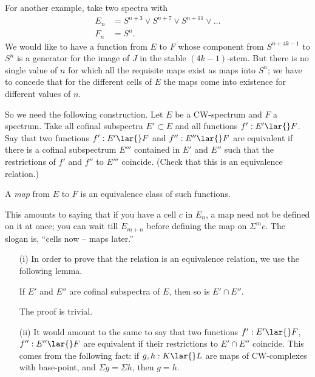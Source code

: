 \documentclass[../main]{subfiles}
\begin{document}
For another example, take two spectra with
    \begin{align*}
    E_n
    &=
    S^{n+3} \vee S^{n+7} \vee S^{n+11} \vee \hdots \\
    F_n &= S^n.
    \end{align*}
We would like to have a function from $E$ to $F$ whose component from $S^{n+4k-1}$ to $S^n$ is a generator for the image of $J$ in the stable $(4k-1)$-stem. But there is no single value of $n$ for which all the requisite maps exist as maps into $S^n$; we have to concede that for the different cells of $E$ the maps come into existence for different values of $n$.

So we need the following construction. Let $E$ be a CW-spectrum and $F$ a spectrum. Take all cofinal subspectra $E'\subset E$ and all functions $f': E'\lar{} F$. Say that two functions $f': E'\lar{} F$ and $f'': E''\lar{} F$ are equivalent if there is a cofinal subspectrum $E'''$ contained in $E'$ and $E''$ such that the restrictions of $f'$ and $f''$ to $E'''$ coincide. (Check that this is an equivalence relation.)

\begin{definition}
A \emph{map} from $E$ to $F$ is an equivalence class of such functions.
\end{definition}

This amounts to saying that if you have a cell $c$ in $E_n$, a map need not be defined on it at once; you can wait till $E_{m+n}$ before defining the map on $\Sigma  ^mc$. The slogan is, ``cells now -- maps later.''

\begin{notes}
    \begin{enumerate}
    \item[(i)] In order to prove that the relation is an equivalence relation, we use the following lemma.
        \begin{lemma}
	    If $E'$ and $E''$ are cofinal subspectra of $E$, then so is $E'\cap E''$.
	    \end{lemma}
    The proof is trivial.
    \item[(ii)] It would amount to the same to say that two functions $f': E'\lar{} F$, $f'': E''\lar{} F$ are equivalent if their restrictions to $E'\cap E''$ coincide. This comes from the following fact: if $g,h: K\lar{} L$ are maps of CW-complexes with base-point, and $\Sigma   g=\Sigma   h$, then $g=h$.
    \end{enumerate}
\end{notes}
\end{document}

